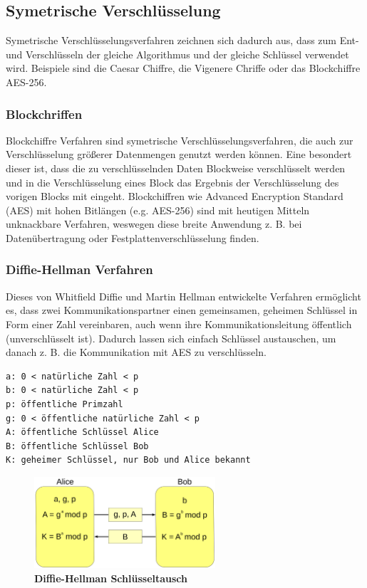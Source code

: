 \subsection{Symetrische Verschlüsselung}

Symetrische Verschlüsselungsverfahren zeichnen sich dadurch aus, dass zum
Ent- und Verschlüsseln der gleiche Algorithmus und der gleiche Schlüssel verwendet
wird. Beispiele sind die Caesar Chiffre, die Vigenere Chriffe oder das Blockchiffre AES-256.

\subsubsection{Blockchriffen}

Blockchiffre Verfahren sind symetrische Verschlüsselungsverfahren,
die auch zur Verschlüsselung größerer Datenmengen genutzt werden können.
Eine besondert dieser ist, dass die zu verschlüsselnden Daten Blockweise
verschlüsselt werden und in die Verschlüsselung eines Block das Ergebnis
der Verschlüsselung des vorigen Blocks mit eingeht.
Blockchiffren wie Advanced Encryption Standard (AES) mit hohen Bitlängen (e.g. AES-256)
sind mit heutigen Mitteln unknackbare Verfahren, weswegen diese breite Anwendung
z. B. bei Datenübertragung oder Festplattenverschlüsselung finden.

\subsubsection{Diffie-Hellman Verfahren}

Dieses von Whitfield Diffie und Martin Hellman entwickelte Verfahren ermöglicht es,
dass zwei Kommunikationspartner einen gemeinsamen, geheimen Schlüssel in Form einer Zahl
vereinbaren, auch wenn ihre Kommunikationsleitung öffentlich (unverschlüsselt ist).
Dadurch lassen sich einfach Schlüssel austauschen, um danach z. B. die Kommunikation
mit AES zu verschlüsseln.

\begin{lstlisting}
a: 0 < natürliche Zahl < p
b: 0 < natürliche Zahl < p
p: öffentliche Primzahl
g: 0 < öffentliche natürliche Zahl < p
A: öffentliche Schlüssel Alice
B: öffentliche Schlüssel Bob
K: geheimer Schlüssel, nur Bob und Alice bekannt
\end{lstlisting}

\begin{figure}[H]
    \centering
    \includegraphics[width=0.6\textwidth]{images/diffie-hellman.png}
    \caption{\textbf{Diffie-Hellman Schlüsseltausch}}
\end{figure}

